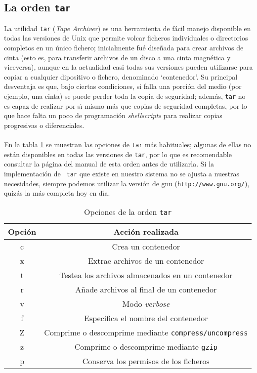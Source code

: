 \subsection{La orden {\tt tar}}
La utilidad {\tt tar} ({\it Tape Archiver}) es una herramienta de f\'acil 
manejo disponible en todas las versiones de Unix que permite volcar ficheros
individuales o directorios completos en un \'unico fichero; inicialmente fu\'e 
dise\~nada para crear archivos de cinta (esto es, para transferir archivos de 
un disco a una cinta magn\'etica y viceversa), aunque en la actualidad casi 
todas sus versiones pueden utilizarse para copiar a cualquier dipositivo o
fichero, denominado `contenedor'. Su principal desventaja es que, bajo ciertas 
condiciones,
si falla una porci\'on del medio (por ejemplo, una cinta) se puede perder toda
la copia de seguridad; adem\'as, {\tt tar} no es capaz de realizar por s\'{\i}
mismo m\'as que copias de seguridad completas, por lo que hace falta un poco
de programaci\'on {\it shellscripts} para realizar copias progresivas o 
diferenciales.\\
\\En la tabla \ref{tarops} se muestran las opciones de {\tt tar} m\'as 
habituales; algunas de ellas no est\'an disponibles en todas las 
versiones de {\tt tar}, por lo que es recomendable consultar la p\'agina 
del manual de esta orden antes de utilizarla. Si la implementaci\'on de {\tt
tar} que existe en nuestro sistema no se ajusta a nuestras necesidades, siempre
podemos utilizar la versi\'on de {\sc gnu} ({\tt http://www.gnu.org/}), quiz\'as
la m\'as completa hoy en d\'{\i}a.
\begin{table}
\begin{center}
\begin{tabular}{|c|c|}
\hline
Opci\'on & Acci\'on realizada\\
\hline\hline
c & Crea un contenedor\\
\hline
x & Extrae archivos de un contenedor\\
\hline
t & Testea los archivos almacenados en un contenedor\\
\hline
r & A\~nade archivos al final de un contenedor\\
\hline
v & Modo {\it verbose}\\
\hline
f & Especifica el nombre del contenedor\\
\hline
Z & Comprime o descomprime mediante {\tt compress/uncompress}\\
\hline
z & Comprime o descomprime mediante {\tt gzip}\\
\hline
p & Conserva los permisos de los ficheros\\
\hline
\end{tabular}
\caption{Opciones de la orden {\tt tar}}
\label{tarops}
\end{center}
\end{table}
